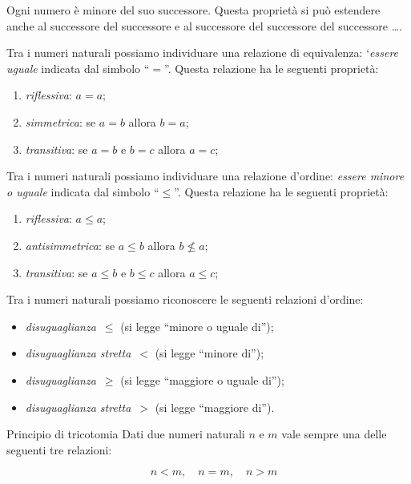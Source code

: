 Ogni numero è minore del suo successore.
Questa proprietà si può estendere anche al successore del successore e 
al successore del successore del successore \dots. 

Tra i numeri naturali possiamo individuare una relazione di 
equivalenza: 
`\emph{essere uguale} indicata dal simbolo ``\(=\)''. 
Questa relazione ha le seguenti proprietà:
\begin{enumerate} [nosep]
\item \emph{riflessiva}: \(a = a\);
\item \emph{simmetrica}: se \(a = b\) allora 
\(b = a\);
\item \emph{transitiva}: se \(a = b\) e \(b = c\) allora 
\(a = c\);
\end{enumerate}

Tra i numeri naturali possiamo individuare una relazione d'ordine: 
\emph{essere minore o uguale} indicata dal simbolo ``\(\leqslant\)''. 
Questa relazione ha le seguenti proprietà:
\begin{enumerate} [nosep]
\item \emph{riflessiva}: \(a \leqslant a\);
\item \emph{antisimmetrica}: se \(a \leqslant b\) allora 
\(b \nleqslant a\);
\item \emph{transitiva}: se \(a \leqslant b\) e \(b \leqslant c\) 
allora \(a \leqslant c\);
\end{enumerate}

\bigskip
Tra i numeri naturali possiamo riconoscere le seguenti relazioni 
d'ordine: \begin{itemize} [nosep]
\item \emph{disuguaglianza}~\(\leqslant\) 
(si legge ``minore o uguale di'');
\item \emph{disuguaglianza stretta}~\(<\) 
(si legge ``minore di'');
\item \emph{disuguaglianza}~\(\geqslant\) 
(si legge ``maggiore o uguale di'');
\item \emph{disuguaglianza stretta}~\(>\) 
(si legge ``maggiore di'').
\end{itemize}

\begin{postulato}{Principio di tricotomia}{}
Dati due numeri naturali \(n\) e \(m\) vale sempre una delle seguenti tre 
relazioni: 

\vspace{-1em}
\[\quad n < m,\quad n = m, \quad n > m\]
\end{postulato}

